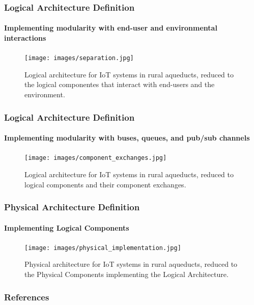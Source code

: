 \documentclass{beamer}
\begin{document}
\begin{frame}
    \frametitle{\small Logical Architecture Definition}
    \framesubtitle{Implementing modularity with end-user and environmental interactions}

    \begin{figure}
        \centering
        \texttt{[image: images/separation.jpg]}
        \caption{Logical architecture for IoT systems in rural aqueducts, reduced to the logical componentes that interact with end-users and the environment.}
    \end{figure}
\end{frame}

\begin{frame}
    \frametitle{\small Logical Architecture Definition}
    \framesubtitle{Implementing modularity with buses, queues, and pub/sub channels}

    \begin{figure}
        \centering
        \texttt{[image: images/component\_exchanges.jpg]}
        \caption{Logical architecture for IoT systems in rural aqueducts, reduced to logical components and their component exchanges.}
    \end{figure}
\end{frame}

\begin{frame}
    \frametitle{\small Physical Architecture Definition}
    \framesubtitle{Implementing Logical Components}

    \begin{figure}
        \centering
        \texttt{[image: images/physical\_implementation.jpg]}
        \caption{Physical architecture for IoT systems in rural aqueducts, reduced to the Physical Components implementing the Logical Architecture.}
    \end{figure}
\end{frame}

\begin{frame}
    \frametitle{References}
    
    
\end{frame}
\end{document}
